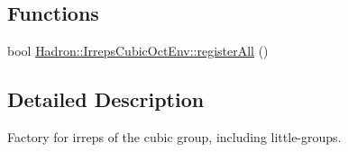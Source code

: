 \subsection*{Functions}
\begin{DoxyCompactItemize}
\item 
bool \mbox{\hyperlink{namespaceHadron_1_1IrrepsCubicOctEnv_add350f077e8bf956336f99fe5dc1c29d}{Hadron\+::\+Irreps\+Cubic\+Oct\+Env\+::register\+All}} ()
\end{DoxyCompactItemize}


\subsection{Detailed Description}
Factory for irreps of the cubic group, including little-\/groups. 

